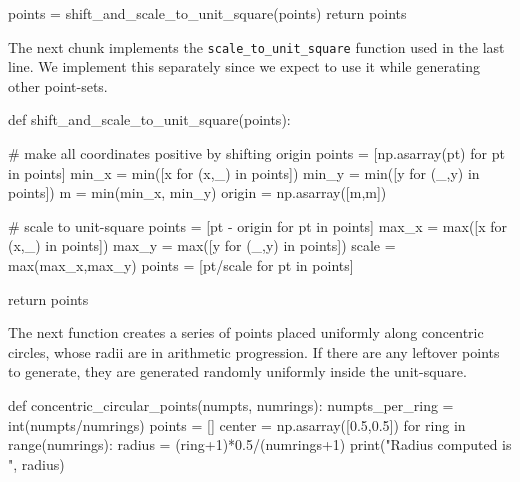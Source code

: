      points = shift_and_scale_to_unit_square(points)
     return points
\nwendcode{}\nwdocspar

The next chunk implements the \verb|scale_to_unit_square| function used 
in the last line. We implement this separately since we expect to use it 
while generating other point-sets. 


\nwenddocs{}\plusendmoddef\nwstartdeflinemarkup{}\nwenddeflinemarkup
def shift_and_scale_to_unit_square(points):
     
     # make all coordinates positive by shifting origin
     points = [np.asarray(pt) for pt in points]
     min_x  = min([x for (x,_) in points])
     min_y  = min([y for (_,y) in points])
     m      = min(min_x, min_y)
     origin = np.asarray([m,m])

     # scale to unit-square
     points = [pt - origin for pt in points]
     max_x  = max([x for (x,_) in points])
     max_y  = max([y for (_,y) in points])
     scale  = max(max_x,max_y)
     points = [pt/scale for pt in points]

     return points
\nwendcode{}\nwdocspar

The next function creates a series of points placed uniformly along concentric circles, whose 
radii are in arithmetic progression. If there are any leftover points to generate, they
are generated randomly uniformly inside the unit-square. 

\nwenddocs{}\plusendmoddef\nwstartdeflinemarkup{}\nwenddeflinemarkup
def concentric_circular_points(numpts, numrings):
     numpts_per_ring = int(numpts/numrings)
     points          = []
     center          = np.asarray([0.5,0.5])
     for ring in range(numrings):
          radius = (ring+1)*0.5/(numrings+1)
          print("Radius computed is ", radius)
         
